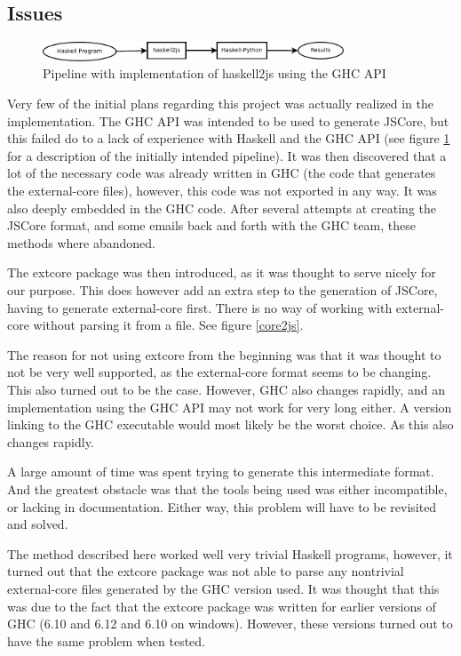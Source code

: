 \subsection{Issues}

\begin{figure}[H]
\centering
\includegraphics[width=0.8\textwidth]{diags/pipe_w_haskell2js}
\caption{Pipeline with implementation of haskell2js using the GHC API}
\label{haskell2js}
\end{figure}

Very few of the initial plans regarding this project was actually realized in the implementation.
The GHC API was intended to be used to generate JSCore, but this failed do to a lack of experience
with Haskell and the GHC API (see figure \ref{haskell2js} for a description of the initially intended
pipeline). It was then discovered that a lot of the necessary code was already
written in GHC (the code that generates the external-core files), however, this code was not 
exported in any way. It was also deeply embedded in the GHC code. After several attempts at creating
the JSCore format, and some emails back and forth with the GHC team, these methods where abandoned.

The extcore package was then introduced, as it was thought to serve nicely for our purpose. This
does however add an extra step to the generation of JSCore, having to generate external-core
first. There is no way of working with external-core without parsing it from a file. See figure \ref{core2js}.

The reason for not using extcore from the beginning was that it was thought to not be very 
well supported, as the external-core format seems to be changing. This also turned out to be
the case. However, GHC also changes rapidly, and an implementation using the GHC API may not
work for very long either. A version linking to the GHC executable would most likely be the
worst choice. As this also changes rapidly.

A large amount of time was spent trying to generate this intermediate format. And the
greatest obstacle was that the tools being used was either incompatible, or lacking in
documentation. Either way, this problem will have to be revisited and solved.

The method described here worked well very trivial Haskell programs, however, 
it turned out that
the extcore package was not able to parse any nontrivial external-core files generated 
by the GHC version used. It was thought that this was due to the fact that the extcore
package was written for earlier versions of GHC (6.10 and 6.12 and 6.10 on windows). However, 
these versions turned out to have the same problem when tested.

